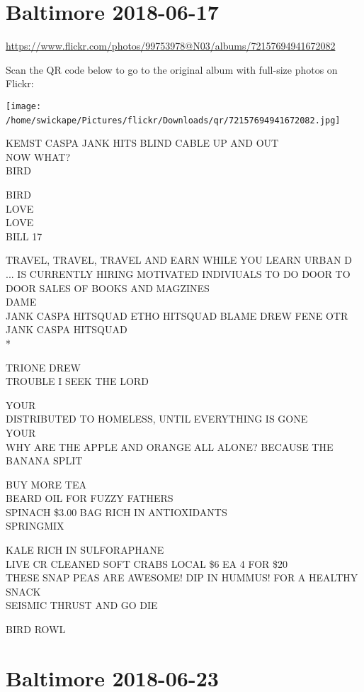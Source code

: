 \documentclass[10pt,letterpaper]{article}
\begin{document}
\section*{Baltimore 2018-06-17}

\url{https://www.flickr.com/photos/99753978@N03/albums/72157694941672082}

Scan the QR code below to go to the original album with full-size photos on Flickr:

\texttt{[image: /home/swickape/Pictures/flickr/Downloads/qr/72157694941672082.jpg]}
\

KEMST CASPA JANK HITS BLIND CABLE UP AND OUT\\
NOW WHAT?\\
BIRD

BIRD\\
LOVE\\
LOVE\\
BILL 17

TRAVEL, TRAVEL, TRAVEL AND EARN WHILE YOU LEARN URBAN D ... IS CURRENTLY HIRING MOTIVATED INDIVIUALS TO DO DOOR TO DOOR SALES OF BOOKS AND MAGZINES\\
DAME\\
JANK CASPA HITSQUAD ETHO HITSQUAD BLAME DREW FENE OTR JANK CASPA HITSQUAD\\
*

TRIONE DREW\\
TROUBLE I SEEK THE LORD

YOUR\\
DISTRIBUTED TO HOMELESS, UNTIL EVERYTHING IS GONE\\
YOUR\\
WHY ARE THE APPLE AND ORANGE ALL ALONE?  BECAUSE THE BANANA SPLIT

BUY MORE TEA\\
BEARD OIL FOR FUZZY FATHERS\\
SPINACH \$3.00 BAG RICH IN ANTIOXIDANTS\\
SPRINGMIX

KALE RICH IN SULFORAPHANE\\
LIVE CR CLEANED SOFT CRABS LOCAL \$6 EA 4 FOR \$20\\
THESE SNAP PEAS ARE AWESOME!  DIP IN HUMMUS!  FOR A HEALTHY SNACK\\
SEISMIC THRUST AND GO DIE

BIRD ROWL
\

\section*{Baltimore 2018-06-23}
\end{document}
